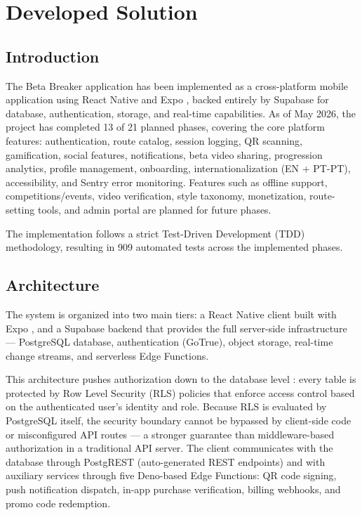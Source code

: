 \documentclass[12pt,a4paper]{report}
\renewcommand\_{\textunderscore\hspace{0pt}}
\begin{document}
\FloatBarrier

\chapter{Developed Solution}

\section{Introduction}

The Beta Breaker application has been implemented as a cross-platform mobile application using React Native \cite{RNDo25} and Expo \cite{ExDo25}, backed entirely by Supabase \cite{SuDo25} for database, authentication, storage, and real-time capabilities. As of May 2026, the project has completed 13 of 21 planned phases, covering the core platform features: authentication, route catalog, session logging, QR scanning, gamification, social features, notifications, beta video sharing, progression analytics, profile management, onboarding, internationalization (EN + PT-PT), accessibility, and Sentry error monitoring. Features such as offline support, competitions/events, video verification, style taxonomy, monetization, route-setting tools, and admin portal are planned for future phases.

The implementation follows a strict Test-Driven Development (TDD) \cite{Beck03} methodology, resulting in 909 automated tests across the implemented phases.

\section{Architecture}

The system is organized into two main tiers: a React Native \cite{RNDo25} client built with Expo \cite{ExDo25}, and a Supabase \cite{SuDo25} backend that provides the full server-side infrastructure --- PostgreSQL database, authentication (GoTrue), object storage, real-time change streams, and serverless Edge Functions.

This architecture pushes authorization down to the database level \cite{SiKo19}: every table is protected by Row Level Security (RLS) \cite{PgDo25} policies that enforce access control based on the authenticated user's identity and role. Because RLS is evaluated by PostgreSQL itself, the security boundary cannot be bypassed by client-side code or misconfigured API routes --- a stronger guarantee than middleware-based authorization in a traditional API server. The client communicates with the database through PostgREST (auto-generated REST endpoints) and with auxiliary services through five Deno-based Edge Functions: QR code signing, push notification dispatch, in-app purchase verification, billing webhooks, and promo code redemption.
\end{document}
